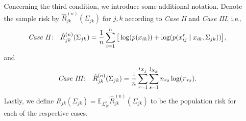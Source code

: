 Concerning the third condition, we introduce some additional notation. Denote the sample risk by $\hat{R}_{jk}^{(n)}(\Sigma_{jk})$ for \(j,k\) according to \textit{Case II} and \textit{Case III}, i.e.,
\begin{equation*}
    \text{\textit{Case II}:} \quad \hat{R}_{jk}^{(n)}(\Sigma_{jk}) = \frac{1}{n} \sum_{i=1}^n \big[\log(p(x_{ik})) + \log(p(x_{ij}^{r} \mid x_{ik}, \Sigma_{jk}))\big],
\end{equation*}
and
\begin{equation*}
    \text{\textit{Case III}:} \quad \hat{R}_{jk}^{(n)}(\Sigma_{jk}) = \frac{1}{n} \sum_{r=1}^{l_{X_{j}}}\sum_{s=1}^{l_{X_{k}}} n_{rs} \log(\pi_{rs}).
\end{equation*}
Lastly, we define $R_{jk}(\Sigma_{jk}) = \mathbb{E}_{\Sigma_{jk}^*}\hat{R}_{jk}^{(n)}(\Sigma_{jk})$ to be the population risk for each of the respective cases.
